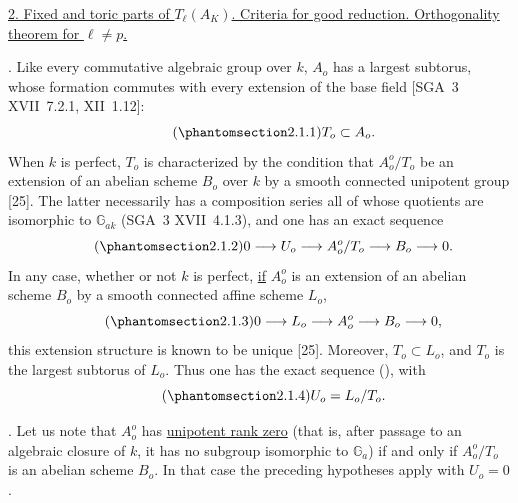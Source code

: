 
\medskip
\noindent
\underline{2. Fixed and toric parts of $T_\ell(A_K)$.  Criteria for
good reduction.  Orthogonality theorem for $\ell\ne p$.}

\medskip
\noindent
{}. Like every commutative algebraic group over $k$, $A_o$ has a
largest subtorus, whose formation commutes with every extension of the
base field [SGA~3 XVII~7.2.1, XII~1.12]:
\begin{equation}\tag{\SGARefTarget{sga7.sga7i.eix.n2-1-1}{2.1.1}}
 T_o\subset A_o.
\end{equation}
When $k$ is perfect, $T_o$ is characterized by the condition that
$A_o^o/T_o$ be an extension of an abelian scheme $B_o$ over $k$ by a
smooth connected unipotent group [25].  The latter necessarily has a
composition series all of whose quotients are isomorphic to
$\mathbb G_{ak}$ (SGA~3 XVII~4.1.3), and one has an exact sequence
\begin{equation}\tag{\SGARefTarget{sga7.sga7i.eix.n2-1-2}{2.1.2}}
 0\longrightarrow U_o\longrightarrow A_o^o/T_o
 \longrightarrow B_o\longrightarrow0.
\end{equation}
In any case, whether or not $k$ is perfect, \underline{if} $A_o^o$ is
an extension of an abelian scheme $B_o$ by a smooth connected affine
scheme $L_o$,
\begin{equation}\tag{\SGARefTarget{sga7.sga7i.eix.n2-1-3}{2.1.3}}
 0\longrightarrow L_o\longrightarrow A_o^o
 \longrightarrow B_o\longrightarrow0,
\end{equation}
this extension structure is known to be unique [25].  Moreover,
$T_o\subset L_o$, and $T_o$ is the largest subtorus of $L_o$.  Thus
one has the exact sequence (), with
\begin{equation}\tag{\SGARefTarget{sga7.sga7i.eix.n2-1-4}{2.1.4}}
 U_o=L_o/T_o.
\end{equation}

\medskip
\noindent
{}. Let us note that $A_o^o$ has \underline{unipotent rank zero}
(that is, after passage to an algebraic closure of $k$, it has no
subgroup isomorphic to $\mathbb G_a$) if and only if $A_o^o/T_o$ is an
abelian scheme $B_o$.  In that case the preceding hypotheses apply
with $U_o=0$.

